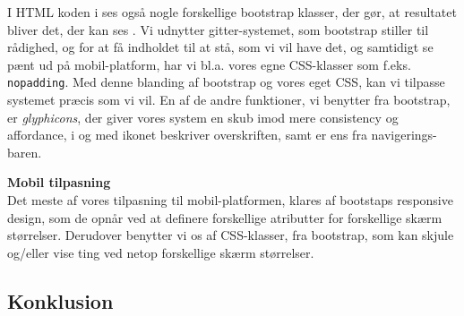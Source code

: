 I HTML koden i  ses også nogle forskellige bootstrap klasser, der gør, at resultatet bliver det, der kan ses . 
Vi udnytter gitter-systemet, som bootstrap stiller til rådighed, og for at få indholdet til at stå, som vi vil have det, og samtidigt se pænt ud på mobil-platform, har vi bl.a. vores egne CSS-klasser som f.eks. \texttt{nopadding}. 
Med denne blanding af bootstrap og vores eget CSS, kan vi tilpasse systemet præcis som vi vil. 
En af de andre funktioner, vi benytter fra bootstrap, er \textit{glyphicons}, der giver vores system en skub imod mere consistency og affordance, i og med ikonet beskriver overskriften, samt er ens fra navigerings-baren.

\textbf{Mobil tilpasning}\hfill\\
Det meste af vores tilpasning til mobil-platformen, klares af bootstaps responsive design, som de opnår ved at definere forskellige atributter for forskellige skærm størrelser.
Derudover benytter vi os af CSS-klasser, fra bootstrap, som kan skjule og/eller vise ting ved netop forskellige skærm størrelser.

\subsection{Konklusion}
